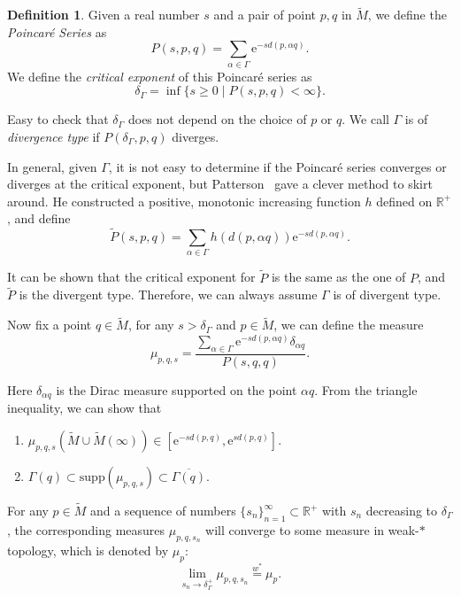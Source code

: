 \documentclass[reqno,11pt]{article}
\theoremstyle{definition}
\newtheorem{definition}[theorem]{Definition}
\theoremstyle{remark}
\numberwithin{equation}{section}
\begin{document}
\begin{definition}
	Given a real number $s$ and a pair of point $p,q$ in $\widetilde{M}$, we define the \emph{Poincar\'e Series} as
	\begin{displaymath}
		P(s,p,q)=\sum_{\alpha\in\Gamma}\mathrm{e}^{-s d(p,\alpha q)}.
	\end{displaymath}
	We define the \emph{critical exponent} of this Poincar\'e series as
	\begin{displaymath}
		\delta_\Gamma=\inf\{s\geq 0\mid P(s,p,q)<\infty\}.
	\end{displaymath}
\end{definition}
Easy to check that $\delta_\Gamma$ does not depend on the choice of $p$ or $q$. We call $\Gamma$ is of \emph{divergence type} if $P(\delta_\Gamma,p,q)$ diverges.

In general, given $\Gamma$, it is not easy to determine if the Poincar\'e series converges or diverges at the critical exponent, but Patterson~\cite{Pa2} gave a clever method to skirt around. He constructed a positive, monotonic increasing function $h$ defined on $\mathbb{R}^{+}$, and define
\begin{displaymath}
	\widetilde{P}(s,p,q)=\sum_{\alpha\in\Gamma}h(d(p,\alpha q))\mathrm{e}^{-s d(p,\alpha q)}.
\end{displaymath}

It can be shown that the critical exponent for $\widetilde{P}$ is the same as the one of $P$, and $\widetilde{P}$ is the divergent type. Therefore, we can always assume $\Gamma$ is of divergent type.

Now fix a point $q\in\widetilde{M}$, for any $s>\delta_\Gamma$ and $p\in\widetilde{M}$, we can define the measure
\begin{displaymath}
	\mu_{p,q,s}=\frac{\sum_{\alpha\in\Gamma}\mathrm{e}^{-s d(p,\alpha q)}\delta_{\alpha q}}{P(s,q,q)}.
\end{displaymath}

Here $\delta_{\alpha q}$ is the Dirac measure supported on the point $\alpha q$. From the triangle inequality, we can show that
\begin{enumerate}
	\item $\mu_{p,q,s}(\widetilde{M}\cup\widetilde{M}(\infty))\in[\mathrm{e}^{-s d(p,q)},\mathrm{e}^{s d(p,q)}]$.
	\item $\Gamma(q)\subset \text{supp}(\mu_{p,q,s})\subset \overline{\Gamma(q)}$.
\end{enumerate}

For any $p\in\widetilde{M}$ and a sequence of numbers ${\{s_n\}}_{n=1}^\infty\subset\mathbb{R}^{+}$ with $s_n$ decreasing to $\delta_\Gamma$, the corresponding measures $\mu_{p,q,s_n}$ will converge to some measure in weak-$*$ topology, which is denoted by $\mu_p$:
\begin{displaymath}
	\lim_{s_n\to\delta_\Gamma^+}\mu_{p,q,s_n}\overset{w^\ast}{=}\mu_p.
\end{displaymath}
\end{document}

